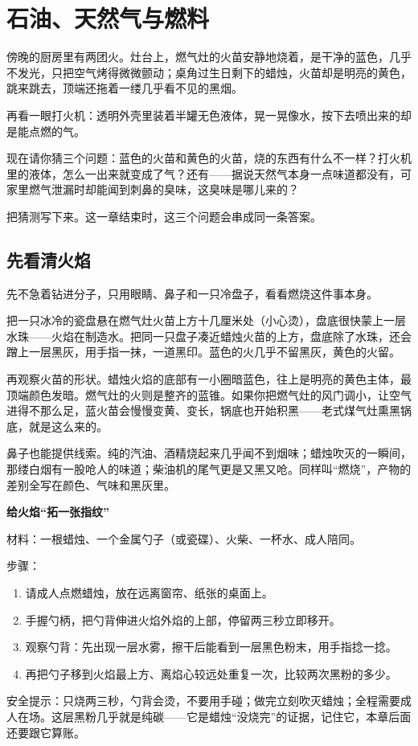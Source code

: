 \chapter{石油、天然气与燃料}

\begin{kaichang}
傍晚的厨房里有两团火。灶台上，燃气灶的火苗安静地烧着，是干净的蓝色，几乎不发光，只把空气烤得微微颤动；桌角过生日剩下的蜡烛，火苗却是明亮的黄色，跳来跳去，顶端还拖着一缕几乎看不见的黑烟。

再看一眼打火机：透明外壳里装着半罐无色液体，晃一晃像水，按下去喷出来的却是能点燃的气。

现在请你猜三个问题：蓝色的火苗和黄色的火苗，烧的东西有什么不一样？打火机里的液体，怎么一出来就变成了气？还有——据说天然气本身一点味道都没有，可家里燃气泄漏时却能闻到刺鼻的臭味，这臭味是哪儿来的？

把猜测写下来。这一章结束时，这三个问题会串成同一条答案。
\end{kaichang}

\section{先看清火焰}

先不急着钻进分子，只用眼睛、鼻子和一只冷盘子，看看燃烧这件事本身。

把一只冰冷的瓷盘悬在燃气灶火苗上方十几厘米处（小心烫），盘底很快蒙上一层水珠——火焰在制造水。把同一只盘子凑近蜡烛火苗的上方，盘底除了水珠，还会蹭上一层黑灰，用手指一抹，一道黑印。蓝色的火几乎不留黑灰，黄色的火留。

再观察火苗的形状。蜡烛火焰的底部有一小圈暗蓝色，往上是明亮的黄色主体，最顶端颜色发暗。燃气灶的火则是整齐的蓝锥。如果你把燃气灶的风门调小，让空气进得不那么足，蓝火苗会慢慢变黄、变长，锅底也开始积黑——老式煤气灶熏黑锅底，就是这么来的。

鼻子也能提供线索。纯的汽油、酒精烧起来几乎闻不到烟味；蜡烛吹灭的一瞬间，那缕白烟有一股呛人的味道；柴油机的尾气更是又黑又呛。同样叫“燃烧”，产物的差别全写在颜色、气味和黑灰里。

\begin{shiyan}
\textbf{给火焰“拓一张指纹”}

材料：一根蜡烛、一个金属勺子（或瓷碟）、火柴、一杯水、成人陪同。

步骤：
\begin{enumerate}[itemsep=1pt]
\item 请成人点燃蜡烛，放在远离窗帘、纸张的桌面上。
\item 手握勺柄，把勺背伸进火焰外焰的上部，停留两三秒立即移开。
\item 观察勺背：先出现一层水雾，擦干后能看到一层黑色粉末，用手指捻一捻。
\item 再把勺子移到火焰最上方、离焰心较远处重复一次，比较两次黑粉的多少。
\end{enumerate}

安全提示：只烧两三秒，勺背会烫，不要用手碰；做完立刻吹灭蜡烛；全程需要成人在场。这层黑粉几乎就是纯碳——它是蜡烛“没烧完”的证据，记住它，本章后面还要跟它算账。
\end{shiyan}

